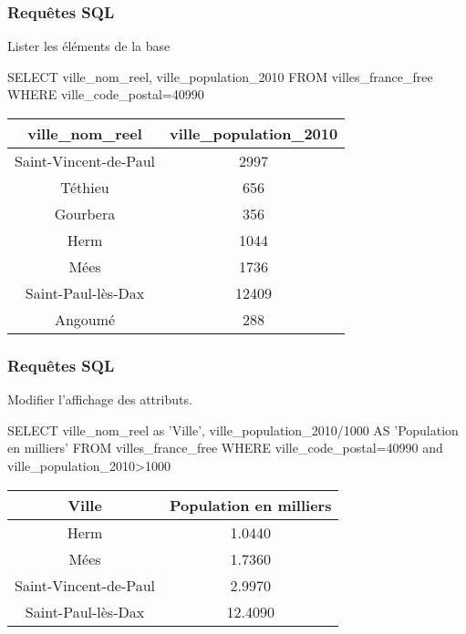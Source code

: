 \begin{frame}[fragile]
\frametitle{Requêtes SQL}

Lister les éléments de la base \\

\begin{GrayBox}[0.85\textwidth]
\begin{semiverbatim}\small
SELECT ville_nom_reel, ville_population_2010
FROM villes_france_free
WHERE ville_code_postal=40990
\end{semiverbatim}
\end{GrayBox}

\begin{center}
\begin{tabular}{|c|c|}
\hline
\textbf{ville\_nom\_reel} & \textbf{ville\_population\_2010} \\
\hline
Saint-Vincent-de-Paul & 2997 \\
\hline
Téthieu & 656 \\
\hline
Gourbera & 356 \\
\hline
Herm & 1044 \\
\hline
Mées & 1736 \\
\hline
Saint-Paul-lès-Dax & 12409 \\
\hline
Angoumé & 288 \\
\hline
\end{tabular}
\end{center}

\end{frame}

\begin{frame}[fragile]
\frametitle{Requêtes SQL}

Modifier l'affichage des attributs.

\begin{GrayBox}[0.85\textwidth]
\begin{semiverbatim}\small
SELECT ville_nom_reel as 'Ville',
ville_population_2010/1000 AS 'Population en milliers'
FROM villes_france_free
WHERE ville_code_postal=40990 and ville_population_2010>1000
\end{semiverbatim}
\end{GrayBox}

\begin{center}
\begin{tabular}{|c|c|}
\hline
\textbf{Ville} & \textbf{Population en milliers} \\
\hline
Herm & 1.0440 \\
\hline
Mées & 1.7360 \\
\hline
Saint-Vincent-de-Paul & 2.9970 \\
\hline
Saint-Paul-lès-Dax & 12.4090 \\
\hline
\end{tabular}
\end{center}

\end{frame}

